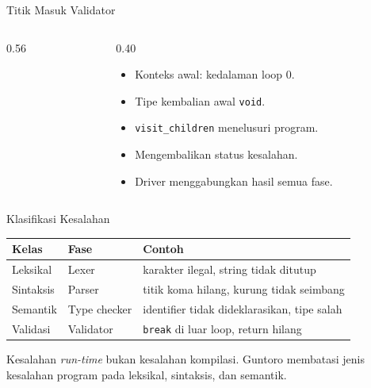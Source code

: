 \documentclass[aspectratio=169,10pt,t]{beamer}
\begin{document}
\begin{frame}[fragile]{Titik Masuk Validator}
  \begin{columns}[T,onlytextwidth]
    \begin{column}{0.56\textwidth}
      
    \end{column}
    \begin{column}{0.40\textwidth}
      \begin{itemize}
        \item Konteks awal: kedalaman loop 0.
        \item Tipe kembalian awal \texttt{void}.
        \item \texttt{visit\_children} menelusuri program.
        \item Mengembalikan status kesalahan.
        \item Driver menggabungkan hasil semua fase.
      \end{itemize}
    \end{column}
  \end{columns}
\end{frame}

\begin{frame}{Klasifikasi Kesalahan}
  \scriptsize
  \setlength{\tabcolsep}{4pt}
  \begin{tabular}{@{}p{2.6cm}p{3.2cm}p{7.2cm}@{}}
    \toprule
    \textbf{Kelas} & \textbf{Fase} & \textbf{Contoh} \\
    \midrule
    Leksikal & Lexer & karakter ilegal, string tidak ditutup \\
    Sintaksis & Parser & titik koma hilang, kurung tidak seimbang \\
    Semantik & Type checker & identifier tidak dideklarasikan, tipe
      salah \\
    Validasi & Validator & \texttt{break} di luar loop, return hilang \\
    \bottomrule
  \end{tabular}

  \vspace{4pt}
  {\scriptsize\color{ubbblue!75}Kesalahan \textit{run-time} bukan
  kesalahan kompilasi. Guntoro membatasi jenis kesalahan program pada
  leksikal, sintaksis, dan semantik.}
\end{frame}
\end{document}
